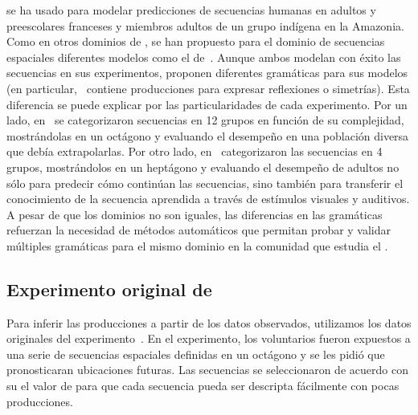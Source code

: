 \gramgeo se ha usado para modelar predicciones de secuencias humanas en adultos y preescolares franceses y miembros adultos de un grupo indígena en la Amazonia. Como en otros dominios de \lot, se han propuesto para el dominio de secuencias espaciales diferentes modelos como el de~\cite{yildirim2015learning}. Aunque ambos modelan con éxito las secuencias en sus experimentos, proponen diferentes gramáticas para sus modelos (en particular,~\cite{amalric2017language} contiene producciones para expresar reflexiones o simetrías). Esta diferencia se puede explicar por las particularidades de cada experimento. Por un lado, en~\cite{amalric2017language} se categorizaron secuencias en 12 grupos en función de su complejidad, mostrándolas en un octágono y evaluando el desempeño en una población diversa que debía extrapolarlas. Por otro lado, en~\cite{yildirim2015learning} categorizaron las secuencias en 4 grupos, mostrándolos en un heptágono y evaluando el desempeño de adultos no sólo para predecir cómo continúan las secuencias, sino también para transferir el conocimiento de la secuencia aprendida a través de estímulos visuales y auditivos. A pesar de que los dominios no son iguales, las diferencias en las gramáticas refuerzan la necesidad de métodos automáticos que permitan probar y validar múltiples gramáticas para el mismo dominio en la comunidad que estudia el \lot.


\subsection{Experimento original de \gramgeo}


Para inferir las producciones a partir de los datos observados, utilizamos los datos originales del experimento~\cite{amalric2017language}. En el experimento, los voluntarios fueron expuestos a una serie de secuencias espaciales definidas en un octágono y se les pidió que pronosticaran ubicaciones futuras. Las secuencias se seleccionaron de acuerdo con su el valor de \mdlgeo para que cada secuencia pueda ser descripta fácilmente con pocas producciones.

